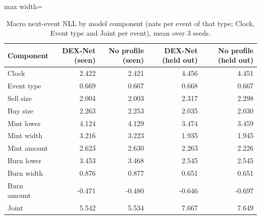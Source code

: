 \begin{table}[t]
\centering
\small
\caption{Macro next-event NLL by model component (nats per event of that type; Clock, Event type and Joint per event), mean over 3 seeds.}
\label{tab:nll_by_head}
\begin{adjustbox}{max width=\linewidth}
\begin{tabular}{lrrrr}
\toprule
Component & DEX-Net (seen) & No profile (seen) & DEX-Net (held out) & No profile (held out) \\
\midrule
Clock & 2.422 & 2.421 & 4.456 & 4.451 \\
Event type & 0.669 & 0.667 & 0.668 & 0.667 \\
Sell size & 2.004 & 2.003 & 2.317 & 2.298 \\
Buy size & 2.263 & 2.253 & 2.035 & 2.030 \\
Mint lower & 4.124 & 4.129 & 3.474 & 3.459 \\
Mint width & 3.216 & 3.223 & 1.935 & 1.945 \\
Mint amount & 2.623 & 2.630 & 2.263 & 2.226 \\
Burn lower & 3.453 & 3.468 & 2.545 & 2.545 \\
Burn width & 0.876 & 0.877 & 0.651 & 0.651 \\
Burn amount & -0.471 & -0.480 & -0.646 & -0.697 \\
Joint & 5.542 & 5.534 & 7.667 & 7.649 \\
\bottomrule
\end{tabular}
\end{adjustbox}
\end{table}
